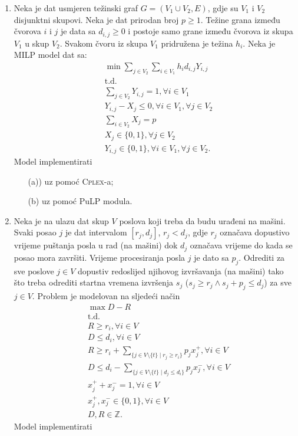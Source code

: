 \documentclass[a4paper, utf8, 11pt, colorlinks]{book}
\theoremstyle{definition}
\begin{document}
\begin{enumerate}
\item %
     Neka je dat usmjeren težinski graf $G= (V_1 \cup V_2, E)$, gdje su $V_1$ i $V_2$ disjunktni skupovi. Neka je dat prirodan broj $p\geq 1$. Težine grana između čvorova $i$ i $j$ je data sa $d_{i,j}\geq 0 $ i postoje samo grane između čvorova iz skupa $V_1$ u skup $V_2$. Svakom čvoru iz skupa $V_1$ pridružena je težina $h_{i}$. 
     Neka je MILP model dat  sa:
     \begin{align*}
     	 &\min \sum_{j \in V_2}\sum_{i \in V_1} h_i d_{i,j} Y_{i,j} \\
     	 &\mbox{t.d.} \\
     	 & \sum_{j \in V_2} Y_{i, j} = 1, \forall i \in V_1 \\
     	 & Y_{i,j} - X_j \leq 0, \forall i  \in V_1, \forall j \in V_2 \\     	 
     	 & \sum_{i \in V_2} X_j  = p \\
     	 & X_j \in \{0, 1\}, \forall j \in V_2 \\
     	 & Y_{i,j} \in \{0, 1\}, \forall i \in V_1, \forall j \in V_2.
     \end{align*}
      Model implementirati
      
      \begin{enumerate}
      	\item[(a))]  uz pomoć \textsc{Cplex}-a; 
      	\item[(b)] uz pomoć PuLP modula.
      \end{enumerate}
   \item   %
   Neka je na ulazu dat skup $V$ poslova koji treba da budu urađeni na mašini. Svaki posao $j$ je dat intervalom $[r_j, d_j]$, $r_j < d_j$, gdje $r_j$ označava dopustivo vrijeme puštanja posla u rad (na mašini) dok $d_j$ označava vrijeme do kada se posao mora završiti.  
   Vrijeme procesiranja posla $j$ je dato sa $p_j$. 
   Odrediti za sve poslove $j  \in V$ dopustiv redoslijed njihovog izvršavanja (na mašini) tako što treba odrediti startna vremena izvršenja $s_j$ ($s_j \geq r_j \wedge s_j + p_j \leq d_j$) za sve $j \in V$. Problem je modelovan na sljedeći način
   \begin{align*}
          &\max D - R \\
          & \mbox{t.d.} \\
          & R \geq r_i, \forall i \in V \\
          & D \leq d_i, \forall i \in V \\
          & R \geq r_i + \sum_{ \{ j \in V \setminus \{t\} \mid r_j \geq r_i \} } p_j x_j^+, \forall i \in V \\
          & D \leq d_i -  \sum_{ \{ j \in V \setminus \{t\} \mid d_j \leq d_i \}} p_j x_j^-, \forall i \in V \\
          & x_j^+ + x_j^-  = 1, \forall i \in V \\
          &   x_j^+, x_j^- \in \{0, 1\}, \forall i \in V \\
          & D, R \in \mathbb{Z}. 
   \end{align*} 
        Model implementirati
  

\end{enumerate}
\end{document}
